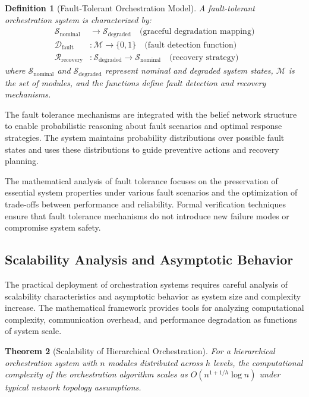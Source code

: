 \documentclass[12pt,a4paper]{article}
\newtheorem{theorem}{Theorem}[section]
\newtheorem{definition}[theorem]{Definition}
\begin{document}
\begin{definition}[Fault-Tolerant Orchestration Model]
A fault-tolerant orchestration system is characterized by:
\begin{align}
\mathcal{S}_{\text{nominal}} &\rightarrow \mathcal{S}_{\text{degraded}} \quad \text{(graceful degradation mapping)} \\
\mathcal{D}_{\text{fault}} &: \mathcal{M} \rightarrow \{0, 1\} \quad \text{(fault detection function)} \\
\mathcal{R}_{\text{recovery}} &: \mathcal{S}_{\text{degraded}} \rightarrow \mathcal{S}_{\text{nominal}} \quad \text{(recovery strategy)}
\end{align}
where $\mathcal{S}_{\text{nominal}}$ and $\mathcal{S}_{\text{degraded}}$ represent nominal and degraded system states, $\mathcal{M}$ is the set of modules, and the functions define fault detection and recovery mechanisms.
\end{definition}

The fault tolerance mechanisms are integrated with the belief network structure to enable probabilistic reasoning about fault scenarios and optimal response strategies. The system maintains probability distributions over possible fault states and uses these distributions to guide preventive actions and recovery planning.

The mathematical analysis of fault tolerance focuses on the preservation of essential system properties under various fault scenarios and the optimization of trade-offs between performance and reliability. Formal verification techniques ensure that fault tolerance mechanisms do not introduce new failure modes or compromise system safety.

\subsection{Scalability Analysis and Asymptotic Behavior}

The practical deployment of orchestration systems requires careful analysis of scalability characteristics and asymptotic behavior as system size and complexity increase. The mathematical framework provides tools for analyzing computational complexity, communication overhead, and performance degradation as functions of system scale.

\begin{theorem}[Scalability of Hierarchical Orchestration]
For a hierarchical orchestration system with $n$ modules distributed across $h$ levels, the computational complexity of the orchestration algorithm scales as $O(n^{1+1/h} \log n)$ under typical network topology assumptions.
\end{theorem}
\end{document}
